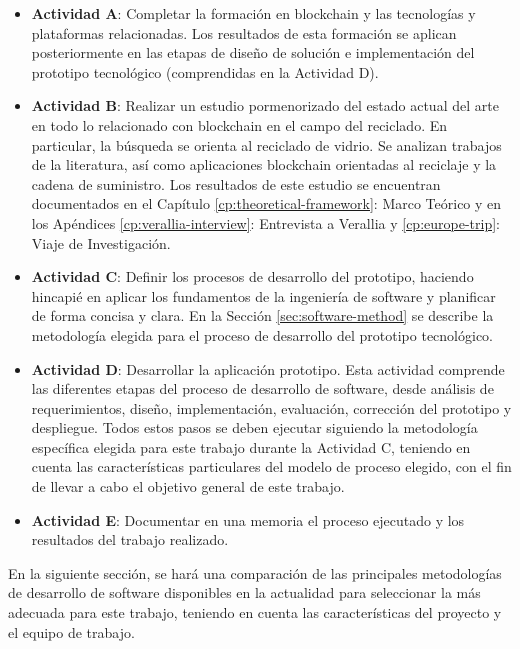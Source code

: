 \begin{itemize}
	\item \textbf{Actividad A}: Completar la formación en blockchain y las tecnologías y plataformas relacionadas. Los resultados de esta formación se aplican posteriormente en las etapas de diseño de solución e implementación del prototipo tecnológico (comprendidas en la Actividad D).
	\item \textbf{Actividad B}: Realizar un estudio pormenorizado del estado actual del arte en todo lo relacionado con blockchain en el campo del reciclado. En particular, la búsqueda se orienta al reciclado de vidrio. Se analizan trabajos de la literatura, así como aplicaciones blockchain orientadas al reciclaje y la cadena de suministro. Los resultados de este estudio se encuentran documentados en el Capítulo \ref{cp:theoretical-framework}: Marco Teórico y en los Apéndices \ref{cp:verallia-interview}: Entrevista a Verallia y \ref{cp:europe-trip}: Viaje de Investigación.
	\item \textbf{Actividad C}: Definir los procesos de desarrollo del prototipo, haciendo hincapié en aplicar los fundamentos de la ingeniería de software y planificar de forma concisa y clara. En la Sección \ref{sec:software-method} se describe la metodología elegida para el proceso de desarrollo del prototipo tecnológico.
	\item \textbf{Actividad D}: Desarrollar la aplicación prototipo. Esta actividad comprende las diferentes etapas del proceso de desarrollo de software, desde análisis de requerimientos, diseño, implementación, evaluación, corrección del prototipo y despliegue. Todos estos pasos se deben ejecutar siguiendo la metodología específica elegida para este trabajo durante la Actividad C, teniendo en cuenta las características particulares del modelo de proceso elegido, con el fin de llevar a cabo el objetivo general de este trabajo.
	\item \textbf{Actividad E}: Documentar en una memoria el proceso ejecutado y los resultados del trabajo realizado.
\end{itemize}

En la siguiente sección, se hará una comparación de las principales metodologías de desarrollo de software disponibles en la actualidad para seleccionar la más adecuada para este trabajo, teniendo en cuenta las características del proyecto y el equipo de trabajo. 


